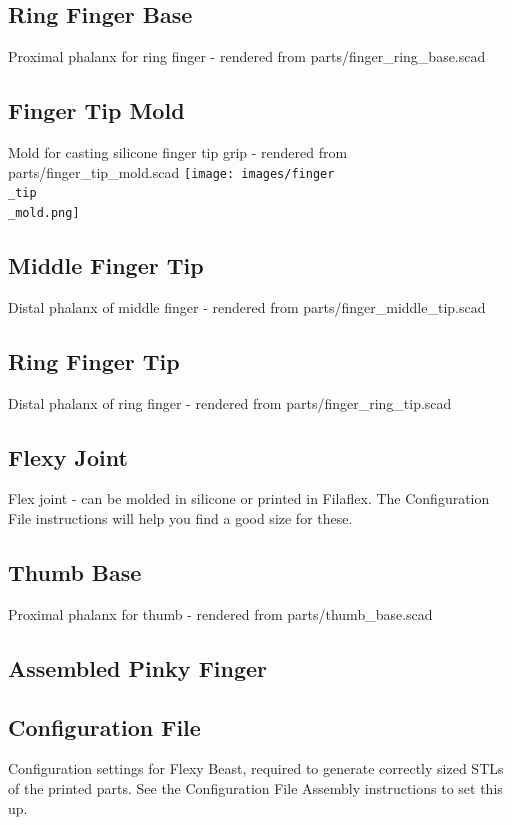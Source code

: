 \documentclass[11pt]{article}
\begin{document}
\hypertarget{thing_ring\_base}{\subsection{Ring Finger Base}}
Proximal phalanx for ring finger - rendered from parts/finger_ring_base.scad

\hypertarget{thing_finger\_tip\_mold}{\subsection{Finger Tip Mold}}
Mold for casting silicone finger tip grip - rendered from parts/finger_tip_mold.scad
\texttt{[image: images/finger\\\_tip\\\_mold.png]}

\hypertarget{thing_middle\_tip}{\subsection{Middle Finger Tip}}
Distal phalanx of middle finger - rendered from parts/finger_middle_tip.scad

\hypertarget{thing_ring\_tip}{\subsection{Ring Finger Tip}}
Distal phalanx of ring finger - rendered from parts/finger_ring_tip.scad

\hypertarget{thing_flexy\_joint}{\subsection{Flexy Joint}}
Flex joint - can be molded in silicone or printed in Filaflex. The Configuration File instructions will help you find a good size for these.

\hypertarget{thing_thumb\_base}{\subsection{Thumb Base}}
Proximal phalanx for thumb - rendered from parts/thumb_base.scad

\hypertarget{thing_pinky\_finger\_assembly}{\subsection{Assembled Pinky Finger}}

\hypertarget{thing_config\_file}{\subsection{Configuration File}}
Configuration settings for Flexy Beast, required to generate correctly sized STLs of the printed parts. See the Configuration File Assembly instructions to set this up.
\end{document}
